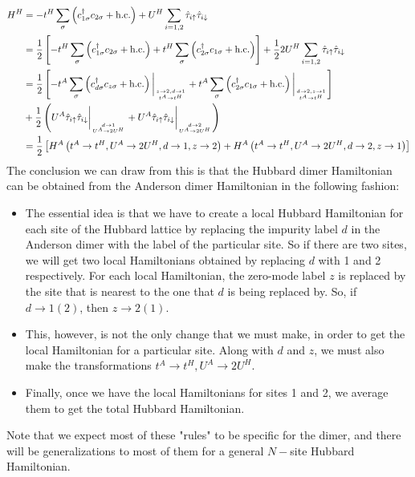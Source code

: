 \documentclass{report}
\numberwithin{equation}{section}
\begin{document}
\begin{equation}\begin{aligned}
	H^H &= -t^H\sum_{\sigma}\left(c^\dagger_{1\sigma}c_{2\sigma} + \text{h.c.}\right) + U^H\sum_{i=1,2}\hat \tau_{i \uparrow}\hat \tau_{i \downarrow}\\
	    &= \frac{1}{2}\left[-t^H\sum_{\sigma}\left(c^\dagger_{1\sigma}c_{2\sigma} + \text{h.c.}\right) + t^H\sum_{\sigma}\left(c^\dagger_{2\sigma}c_{1\sigma} + \text{h.c.}\right)\right] + \frac{1}{2} 2U^H\sum_{i=1,2}\hat \tau_{i \uparrow}\hat \tau_{i \downarrow}\\
	    &= \frac{1}{2}\left[-t^A\sum_{\sigma}\left(c^\dagger_{d\sigma}c_{z\sigma} + \text{h.c.}\right)\bigg\vert_{z \to 2, d \to 1\atop{t^A \to t^H}} + t^A\sum_{\sigma}\left(c^\dagger_{2\sigma}c_{1\sigma} + \text{h.c.}\right)\bigg\vert_{d \to 2,z \to 1\atop{t^A \to t^H}} \right] \\
	    &+ \frac{1}{2} \left(U^A\hat \tau_{i \uparrow}\hat \tau_{i \downarrow}\bigg\vert_{d \to 1\atop{U^A \to 2U^H}} + U^A\hat \tau_{i \uparrow}\hat \tau_{i \downarrow}\bigg\vert_{d \to 2\atop{U^A \to 2U^H}}\right)\\
	    &=\frac{1}{2}\left[H^A\left(t^A \to t^H, U^A \to 2U^H, d \to 1, z \to 2\right) + H^A\left(t^A \to t^H, U^A \to 2U^H, d \to 2, z \to 1\right)\right]
\end{aligned}\end{equation}
The conclusion we can draw from this is that the Hubbard dimer Hamiltonian can be obtained from the Anderson dimer Hamiltonian in the following fashion:
\begin{itemize}
	\item The essential idea is that we have to create a local Hubbard Hamiltonian for each site of the Hubbard lattice by replacing the impurity label \(d\) in the Anderson dimer with the label of the particular site. So if there are two sites, we will get two local Hamiltonians obtained by replacing \(d\) with 1 and 2 respectively. For each local Hamiltonian, the zero-mode label \(z\) is replaced by the site that is nearest to the one that \(d\) is being replaced by. So, if \(d \to 1(2)\), then \(z \to 2(1)\).
	\item This, however, is not the only change that we must make, in order to get the local Hamiltonian for a particular site. Along with \(d\) and \(z\), we must also make the transformations \(t^A \to t^H, U^A \to 2U^H\).
	\item Finally, once we have the local Hamiltonians for sites 1 and 2, we average them to get the total Hubbard Hamiltonian.
\end{itemize}
Note that we expect most of these "rules" to be specific for the dimer, and there will be generalizations to most of them for a general \(N-\)site Hubbard Hamiltonian.
\end{document}
